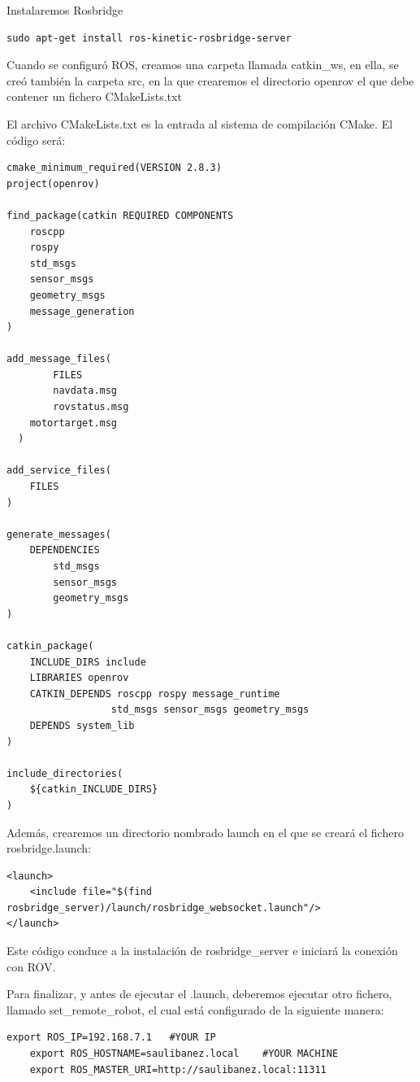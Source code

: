 Instalaremos Rosbridge
\begin{lstlisting}[caption=Rosbridge, label={lst:rosbridge}]
sudo apt-get install ros-kinetic-rosbridge-server
\end{lstlisting}

Cuando se configuró ROS, creamos una carpeta llamada catkin\_ws, en ella, se creó también la carpeta src, en la que crearemos el directorio openrov el que debe contener un fichero CMakeLists.txt

El archivo CMakeLists.txt es la entrada al sistema de compilación CMake. El código será:

\begin{lstlisting}[caption=CMakeLists.txt, label={lst:cmakelists}]
cmake_minimum_required(VERSION 2.8.3)
project(openrov)

find_package(catkin REQUIRED COMPONENTS
  	roscpp
  	rospy
  	std_msgs
 	sensor_msgs
  	geometry_msgs
  	message_generation
)

add_message_files(
    	FILES
    	navdata.msg
    	rovstatus.msg
   	motortarget.msg
  )

add_service_files(
    FILES
)

generate_messages(
	DEPENDENCIES
    	std_msgs
    	sensor_msgs
    	geometry_msgs
)

catkin_package(
   	INCLUDE_DIRS include
   	LIBRARIES openrov
   	CATKIN_DEPENDS roscpp rospy message_runtime
                  std_msgs sensor_msgs geometry_msgs
   	DEPENDS system_lib
)

include_directories(
  	${catkin_INCLUDE_DIRS}
)
\end{lstlisting}


Además, crearemos un directorio nombrado launch en el que se creará el fichero rosbridge.launch:

\begin{lstlisting}[caption=websocket.launch, label={lst:launch}]
<launch>
 	<include file="$(find rosbridge_server)/launch/rosbridge_websocket.launch"/>
</launch>
\end{lstlisting}

Este código conduce a la instalación de rosbridge\_server e iniciará la conexión con ROV.

Para finalizar, y antes de ejecutar el .launch, deberemos ejecutar otro fichero, llamado set\_remote\_robot, el cual está configurado de la siguiente manera:
\begin{lstlisting}[caption=set\_remote\_robot, label={lst:remote}]
	export ROS_IP=192.168.7.1 	#YOUR IP
	export ROS_HOSTNAME=saulibanez.local 	#YOUR MACHINE
	export ROS_MASTER_URI=http://saulibanez.local:11311
\end{lstlisting}

